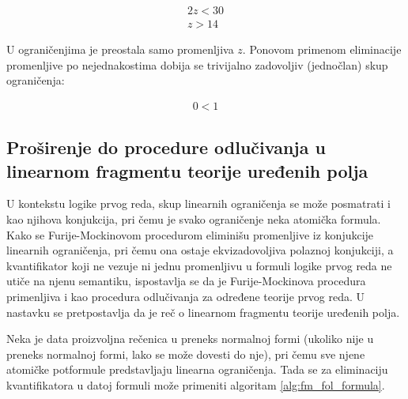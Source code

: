 \documentclass[a4paper,10pt]{article}
\begin{document}
\begin{equation}
\begin{gathered}
    \label{eq:example_s_3}
    2z < 30 \\
    z > 14
\end{gathered}
\end{equation}

U ograničenjima je preostala samo promenljiva $z$. Ponovom primenom eliminacije promenljive po nejednakostima dobija se trivijalno zadovoljiv (jednočlan) skup ograničenja:

\begin{equation}
\begin{gathered}
    \label{eq:example_s_4}
    0 < 1
\end{gathered}
\end{equation}

\subsection{Proširenje do procedure odlučivanja u linearnom fragmentu teorije uređenih polja}

U kontekstu logike prvog reda, skup linearnih ograničenja se može posmatrati i kao njihova konjukcija, pri čemu je svako ograničenje neka atomička formula. Kako se Furije-Mockinovom procedurom eliminišu promenljive iz konjukcije linearnih ograničenja, pri čemu ona ostaje ekvizadovoljiva polaznoj konjukciji, a kvantifikator koji ne vezuje ni jednu promenljivu u formuli logike prvog reda ne utiče na njenu semantiku, ispostavlja se da je Furije-Mockinova procedura primenljiva i kao procedura odlučivanja za određene teorije prvog reda. U nastavku se pretpostavlja da je reč o linearnom fragmentu teorije uređenih polja.

Neka je data proizvoljna rečenica u preneks normalnoj formi (ukoliko nije u preneks normalnoj formi, lako se može dovesti do nje), pri čemu sve njene atomičke potformule predstavljaju linearna ograničenja. Tada se za eliminaciju kvantifikatora u datoj formuli može primeniti algoritam \ref{alg:fm_fol_formula}.
\end{document}
